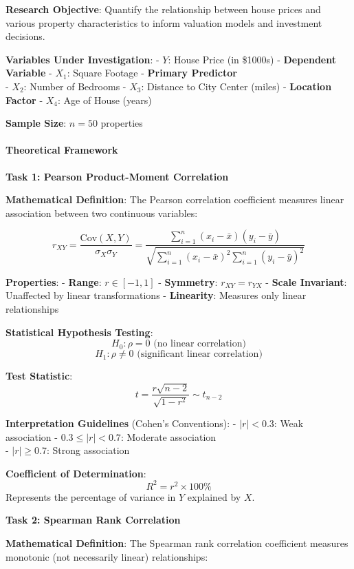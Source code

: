 \documentclass[11pt]{article}
\begin{document}
\textbf{Research Objective}: Quantify the relationship between house
prices and various property characteristics to inform valuation models
and investment decisions.

\textbf{Variables Under Investigation}: - \(Y\): House Price (in
\$1000s) - \textbf{Dependent Variable} - \(X_1\): Square Footage -
\textbf{Primary Predictor}\\
- \(X_2\): Number of Bedrooms - \(X_3\): Distance to City Center (miles)
- \textbf{Location Factor} - \(X_4\): Age of House (years)

\textbf{Sample Size}: \(n = 50\) properties

\paragraph{Theoretical Framework}\label{theoretical-framework}

\textbf{Task 1: Pearson Product-Moment Correlation}

\textbf{Mathematical Definition}: The Pearson correlation coefficient
measures linear association between two continuous variables:

\[r_{XY} = \frac{\text{Cov}(X,Y)}{\sigma_X \sigma_Y} = \frac{\sum_{i=1}^{n}(x_i - \bar{x})(y_i - \bar{y})}{\sqrt{\sum_{i=1}^{n}(x_i - \bar{x})^2 \sum_{i=1}^{n}(y_i - \bar{y})^2}}\]

\textbf{Properties}: - \textbf{Range}: \(r \in [-1, 1]\) -
\textbf{Symmetry}: \(r_{XY} = r_{YX}\) - \textbf{Scale Invariant}:
Unaffected by linear transformations - \textbf{Linearity}: Measures only
linear relationships

\textbf{Statistical Hypothesis Testing}:
\[H_0: \rho = 0 \text{ (no linear correlation)}\]
\[H_1: \rho \neq 0 \text{ (significant linear correlation)}\]

\textbf{Test Statistic}:
\[t = \frac{r\sqrt{n-2}}{\sqrt{1-r^2}} \sim t_{n-2}\]

\textbf{Interpretation Guidelines} (Cohen's Conventions): -
\(|r| < 0.3\): Weak association - \(0.3 \leq |r| < 0.7\): Moderate
association\\
- \(|r| \geq 0.7\): Strong association

\textbf{Coefficient of Determination}: \[R^2 = r^2 \times 100\%\]
Represents the percentage of variance in \(Y\) explained by \(X\).

\textbf{Task 2: Spearman Rank Correlation}

\textbf{Mathematical Definition}: The Spearman rank correlation
coefficient measures monotonic (not necessarily linear) relationships:
\end{document}
